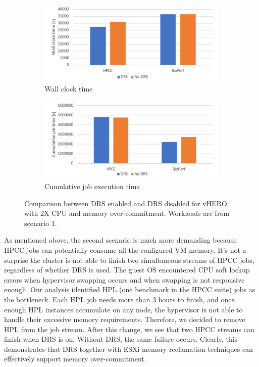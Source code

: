 \begin{figure}
     \centering
     \begin{subfigure}[b]{0.45\textwidth}
         \centering
         \includegraphics[width=\textwidth]{Figures/memory_wct}
         \caption{Wall clock time}
         \label{fig:memory_wct}
     \end{subfigure}
     \hfill
     \begin{subfigure}[b]{0.45\textwidth}
         \centering
         \includegraphics[width=\textwidth]{Figures/memory_cjet}
         \caption{Cumulative job execution time}
         \label{fig:memory_cjet}
     \end{subfigure}
     \caption{Comparison between DRS enabled and DRS disabled for vHERO with 2X CPU and memory over-commitment. Workloads are from scenario 1. }
     \label{fig:memory_scenario1}
\end{figure}

As mentioned above, the second scenario is much more demanding because HPCC jobs can potentially consume all the configured VM memory. It's not a surprise the cluster is not able to finish two simultaneous streams of HPCC jobs, regardless of whether DRS is used. The guest OS encountered CPU soft lockup errors when hypervisor swapping occurs and when swapping is not responsive enough. Our analysis identified HPL (one benchmark in the HPCC suite) jobs as the bottleneck. Each HPL job needs more than 3 hours to finish, and once enough HPL instances accumulate on any node, the hypervisor is not able to handle their excessive memory requirements. Therefore, we decided to remove HPL from the job stream. After this change, we see that two HPCC streams can finish when DRS is on. Without DRS, the same failure occurs. Clearly, this demonstrates that DRS together with ESXi memory reclamation techniques can effectively support memory over-commitment. 

